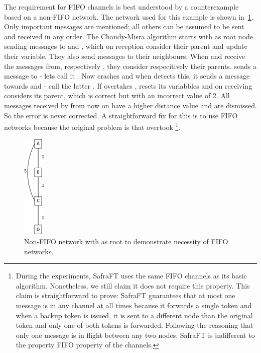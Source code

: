 The requirement for FIFO channels is best understood by a counterexample based on a non-FIFO network.
The network used for this example is shown in~\cref{fig:fifoNecessaryNetwork}.
Only important messages are mentioned; all others can be assumed to be sent and received in any order.
The Chandy-Misra algorithm starts with  as root node sending  messages to  and , which on reception consider  their parent and update their  variable.
They also send  messages to their neighbours.
When  and  receive the  messages from,  respectively , they consider  respecitively  their parents.
 sends a  message to  - lets call it .
Now  crashes and when  detects this, it sends a  message towards  and  - call the latter .
If  overtakes ,  resets its variabbles and on receiving  considers  its parent, which is correct but with an incorrect  value of 2.
All  messages received by  from now on have a higher distance value and are dismissed.
So the error is never corrected.
A straightforward fix for this is to use FIFO networks because the original problem is that  overtook \footnote{During the experiments, SafraFT uses the same FIFO channels as its basic algorithm.
Nonetheless, we still claim it does not require this property.
This claim is straightforward to prove: SafraFT guarantees that at most one message is in any channel at all times because it forwards a single token and when a backup token is issued, it is sent to a different node than the original token and only one of both tokens is forwarded.
Following the reasoning that only one message is in flight between any two nodes, SafraFT is indifferent to the property FIFO property of the channels.}.

\begin{figure}[h]
    \includegraphics[height=5cm]{figures/FIFO_necessary}
    \centering
    \caption{Non-FIFO network with  as root to demonstrate necessity of FIFO networks.}
    \label{fig:fifoNecessaryNetwork}
\end{figure}

